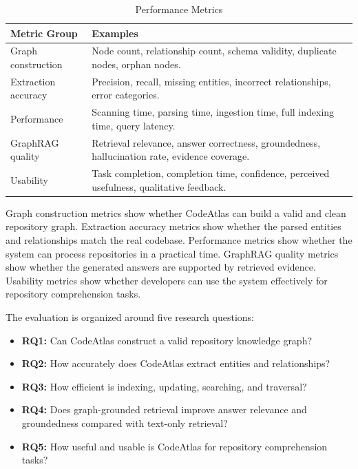 \documentclass[conference]{IEEEtran}
\begin{document}
\begin{table}[!t]
\caption{Performance Metrics}
\label{tab:metrics}
\centering
\begin{tabularx}{\columnwidth}{lY}
\toprule
\textbf{Metric Group} & \textbf{Examples} \\
\midrule
Graph construction & Node count, relationship count, schema validity, duplicate nodes, orphan nodes. \\
Extraction accuracy & Precision, recall, missing entities, incorrect relationships, error categories. \\
Performance & Scanning time, parsing time, ingestion time, full indexing time, query latency. \\
GraphRAG quality & Retrieval relevance, answer correctness, groundedness, hallucination rate, evidence coverage. \\
Usability & Task completion, completion time, confidence, perceived usefulness, qualitative feedback. \\
\bottomrule
\end{tabularx}
\end{table}

Graph construction metrics show whether CodeAtlas can build a valid and clean repository graph. Extraction accuracy metrics show whether the parsed entities and relationships match the real codebase. Performance metrics show whether the system can process repositories in a practical time. GraphRAG quality metrics show whether the generated answers are supported by retrieved evidence. Usability metrics show whether developers can use the system effectively for repository comprehension tasks.

The evaluation is organized around five research questions:
\begin{itemize}
    \item \textbf{RQ1:} Can CodeAtlas construct a valid repository knowledge graph?
    \item \textbf{RQ2:} How accurately does CodeAtlas extract entities and relationships?
    \item \textbf{RQ3:} How efficient is indexing, updating, searching, and traversal?
    \item \textbf{RQ4:} Does graph-grounded retrieval improve answer relevance and groundedness compared with text-only retrieval?
    \item \textbf{RQ5:} How useful and usable is CodeAtlas for repository comprehension tasks?
\end{itemize}
\end{document}
